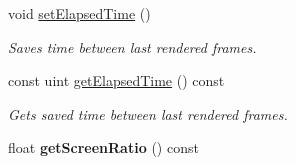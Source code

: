 \begin{DoxyCompactItemize}
\mbox{\label{class_game_engine_a579b1c7d9ca8d4cb9f788824f969ae68}} 
void \mbox{\hyperlink{class_game_engine_a579b1c7d9ca8d4cb9f788824f969ae68}{set\+Elapsed\+Time}} ()
\begin{DoxyCompactList}\small\item\em Saves time between last rendered frames. \end{DoxyCompactList}\item 
\mbox{\label{class_game_engine_a83d4cc180c4ad2c7db5224ce840140e1}} 
const uint \mbox{\hyperlink{class_game_engine_a83d4cc180c4ad2c7db5224ce840140e1}{get\+Elapsed\+Time}} () const
\begin{DoxyCompactList}\small\item\em Gets saved time between last rendered frames. \end{DoxyCompactList}\item 
\mbox{\label{class_game_engine_a6328d97829e7f0a79a5672c5dd040592}} 
float {\bfseries get\+Screen\+Ratio} () const
\end{DoxyCompactItemize}
